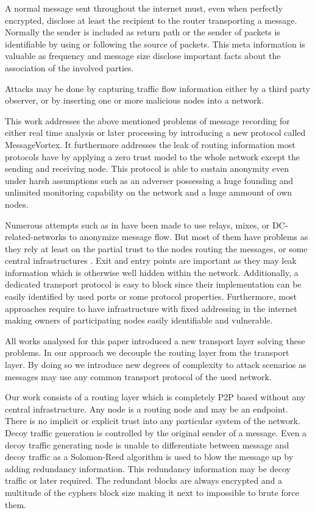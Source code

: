 \documentclass[9pt,journal,compsoc]{IEEEtran}
\begin{document}
A normal message sent throughout the internet must, even when perfectly encrypted, disclose at least the recipient to the router transporting a message. Normally the sender is included as return path or the sender of packets is identifiable by using or following the source of packets. This meta information is valuable as frequency and message size disclose important facts about the association of the involved parties. 

Attacks may be done by capturing traffic flow information either by a third party observer, or by inserting one or more malicious nodes into a network. 

This work addresses the above mentioned problems of message recording for either real time analysis or later processing by introducing a new  protocol called MessageVortex. It furthermore addresses the leak of routing information most protocols have by applying a zero trust model to the whole network except the sending and receiving node. This protocol is able to sustain anonymity even under harsh assumptions such as an adverser possessing a huge founding and unlimited monitoring capability on the network and a huge ammount of own nodes. 

Numerous attempts such as in \cite{minion-design,babel,mixmaster-spec,tor-design,freehaven-berk,herbivore:tr} have been made to use relays\cite{CHAUM1}, mixes\cite{CHAUM1}, or DC-related-networks\cite{chaum-dc} to anonymize message flow. But most of them have problems as they rely at least on the partial trust to the nodes routing the messages, or some central infrastructures \cite{hs-attack06,esorics13-cellflood,esorics12-torscan,oakland2013-trawling}. Exit and entry points are important as they may leak information which is otherwise well hidden within the network. Additionally, a dedicated transport protocol is easy to block since their implementation can be easily identified by used ports or some protocol properties. Furthermore, most approaches require to have infrastructure with fixed addressing in the internet making owners of participating nodes easily identifiable and vulnerable.

All works analysed for this paper introduced a new transport layer solving these problems. In our approach we decouple the routing layer from the transport layer. By doing so we introduce new degrees of complexity to attack scenarios as messages may use any common transport protocol of the used network. 

Our work consists of a routing layer which is completely P2P based without any central infrastructure. Any node is a routing node and may be an endpoint. There is no implicit or explicit trust into any particular system of the  network. Decoy traffic generation is controlled by the original sender of a message. Even a decoy traffic generating node is unable to differentiate between message and decoy traffic as a Solomon-Reed algorithm is used to blow the message up by adding redundancy information. This redundancy information may be decoy traffic or later required. The redundant blocks are always encrypted and a multitude of the cyphers block size making it next to impossible to brute force them.
\end{document}
